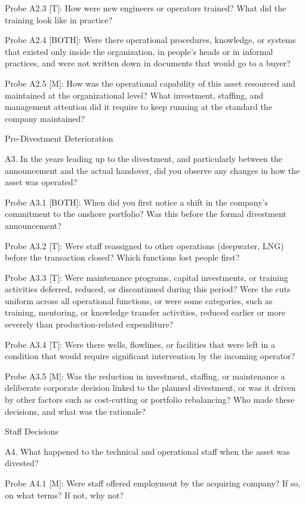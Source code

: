 Probe A2.3 {[}T{]}: How were new engineers or operators trained? What
did the training look like in practice?

Probe A2.4 {[}BOTH{]}: Were there operational procedures, knowledge, or
systems that existed only inside the organization, in people's heads or
in informal practices, and were not written down in documents that would
go to a buyer?

Probe A2.5 {[}M{]}: How was the operational capability of this asset
resourced and maintained at the organizational level? What investment,
staffing, and management attention did it require to keep running at the
standard the company maintained?

Pre-Divestment Deterioration

A3. In the years leading up to the divestment, and particularly between
the announcement and the actual handover, did you observe any changes in
how the asset was operated?

Probe A3.1 {[}BOTH{]}: When did you first notice a shift in the
company's commitment to the onshore portfolio? Was this before the
formal divestment announcement?

Probe A3.2 {[}T{]}: Were staff reassigned to other operations
(deepwater, LNG) before the transaction closed? Which functions lost
people first?

Probe A3.3 {[}T{]}: Were maintenance programs, capital investments, or
training activities deferred, reduced, or discontinued during this
period? Were the cuts uniform across all operational functions, or were
some categories, such as training, mentoring, or knowledge transfer
activities, reduced earlier or more severely than production-related
expenditure?

Probe A3.4 {[}T{]}: Were there wells, flowlines, or facilities that were
left in a condition that would require significant intervention by the
incoming operator?

Probe A3.5 {[}M{]}: Was the reduction in investment, staffing, or
maintenance a deliberate corporate decision linked to the planned
divestment, or was it driven by other factors such as cost-cutting or
portfolio rebalancing? Who made these decisions, and what was the
rationale?

Staff Decisions

A4. What happened to the technical and operational staff when the asset
was divested?

Probe A4.1 {[}M{]}: Were staff offered employment by the acquiring
company? If so, on what terms? If not, why not?

